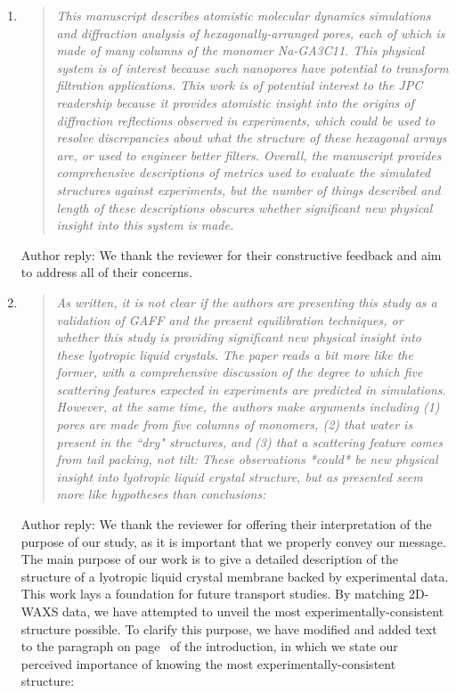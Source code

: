 \documentclass{article}
\begin{document}
\begin{enumerate}
	
    \item \begin{quote} \textit{This manuscript describes atomistic molecular
	    dynamics simulations and diffraction analysis of hexagonally-arranged pores,
	    each of which is made of many columns of the monomer Na-GA3C11. This physical
	    system is of interest because such nanopores have potential to transform
	    filtration applications. This work is of potential interest to the JPC
	    readership because it provides atomistic insight into the origins of
	    diffraction reflections observed in experiments, which could be used to resolve
	    discrepancies about what the structure of these hexagonal arrays are, or used
	    to engineer better filters. Overall, the manuscript provides comprehensive
	    descriptions of metrics used to evaluate the simulated structures against
	    experiments, but the number of things described and length of these
	    descriptions obscures whether significant new physical insight into this system
	    is made.} 
    \end{quote}
	
    Author reply: We thank the reviewer for their constructive feedback and aim to 
    address all of their concerns. 
	
    \item \begin{quote}
    \textit{As written, it is not clear if the authors are presenting this
	    study as a validation of GAFF and the present equilibration techniques, or
	    whether this study is providing significant new physical insight into these
	    lyotropic liquid crystals. The paper reads a bit more like the former, with a
	    comprehensive discussion of the degree to which five scattering features
	    expected in experiments are predicted in simulations. However, at the same
	    time, the authors make arguments including (1) pores are made from five columns
	    of monomers, (2) that water is present in the ``dry" structures, and (3) that a
	    scattering feature comes from tail packing, not tilt: These observations
	    *could* be new physical insight into lyotropic liquid crystal structure, but as
	    presented seem more like hypotheses than conclusions:}

    \end{quote}

    Author reply: We thank the reviewer for offering their interpretation of
    the purpose of our study, as it is important that we properly convey our
    message. The main purpose of our work is to give a detailed description of the
    structure of a lyotropic liquid crystal membrane backed by experimental data.
    This work lays a foundation for future transport studies. By matching 2D-WAXS
    data, we have attempted to unveil the most experimentally-consistent structure
    possible. To clarify this purpose, we have modified and added text to the
    paragraph on page~\pageref{M-rework:purpose} of the introduction, in which we
    state our perceived importance of knowing the most experimentally-consistent
    structure:


\end{enumerate}
\end{document}
